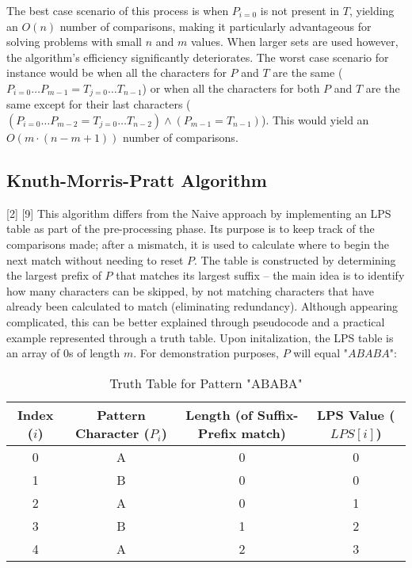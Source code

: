 \documentclass[12pt]{article}
\begin{document}
The best case scenario of this process is when $P_{i=0}$ is not present in $T$, yielding an
$O(n)$ number of comparisons, making it particularly advantageous for solving problems
with small $n$ and $m$ values. When larger sets are used however, the algorithm's efficiency significantly deteriorates. The worst case scenario for instance would be when
all the characters for $P$ and $T$ are the same (${P_{i=0} \ldots P_{m-1}} = {T_{j=0} \ldots T_{n-1}}$) or
when all the characters for both $P$ and $T$ are the same except for their last characters ($({P_{i=0} \ldots P_{m-2}} = {T_{j=0} \ldots T_{n-2}}) \land (P_{m-1} = T_{n-1})$). This would yield an
$O(m \cdot (n - m + 1))$ number of comparisons.

\subsection{Knuth-Morris-Pratt Algorithm}

[2] [9] This algorithm differs from the Naive approach by implementing an LPS table
as part of the pre-processing phase. Its purpose is to keep track of the comparisons made;
after a mismatch, it is used to calculate where to begin the next match without needing
to reset $P$. The table is constructed by determining the largest prefix of $P$ that matches
its largest suffix -- the main idea is to identify how many characters can be skipped, by not
matching characters that have already been calculated to match (eliminating redundancy).
Although appearing complicated, this can be better explained through pseudocode and a
practical example represented through a truth table. Upon initalization, the LPS table is
an array of 0s of length $m$. For demonstration purposes, $P$ will equal "$ABABA$":

\begin{table}[!htbp]
    \centering
    \begin{tabular}{|c|c|c|c|}
        \hline
        Index ($i$) & Pattern Character ($P_{i}$) & Length (of Suffix-Prefix match) & LPS Value ($LPS[i]$) \\
        \hline
        0 & A & 0 & 0 \\
        1 & B & 0 & 0 \\
        2 & A & 0 & 1 \\
        3 & B & 1 & 2 \\
        4 & A & 2 & 3 \\
        \hline
    \end{tabular}
    \caption{Truth Table for Pattern "ABABA"}
\end{table}
\end{document}
